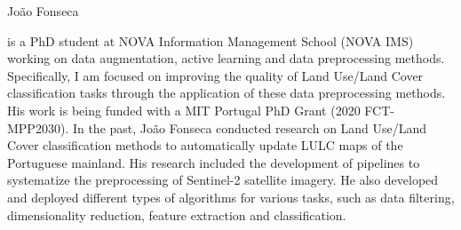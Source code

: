 \documentclass[10pt,journal,compsoc]{IEEEtran}
\begin{document}
% 

\begin{IEEEbiography}{João Fonseca}

is a PhD student at NOVA Information Management School (NOVA IMS) working on
data augmentation, active learning and data preprocessing methods.
Specifically, I am focused on improving the quality of Land Use/Land Cover
classification tasks through the application of these data preprocessing
methods. His work is being funded with a MIT Portugal PhD Grant (2020
FCT-MPP2030). In the past, João Fonseca conducted research on Land Use/Land
Cover classification methods to automatically update LULC maps of the
Portuguese mainland. His research included the development of pipelines to
systematize the preprocessing of Sentinel-2 satellite imagery. He also
developed and deployed different types of algorithms for various tasks, such
as data filtering, dimensionality reduction, feature extraction and
classification.

\end{IEEEbiography}
\end{document}
